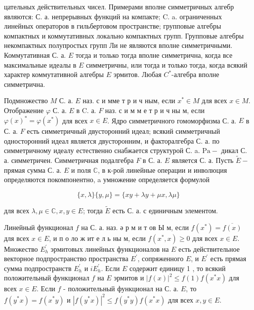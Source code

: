 \documentclass[10pt]{article}
\begin{document}
цательных действительных чисел. Примерами вполне симметричных алгебр являются: С. а. непрерывных функций на компакте; C. a. ограниченных линейных операторов в гильбертовом пространстве; групповые алгебры компактных и коммутативных локально компактных групп. Групповые алгебры некомпактных полупростых групп Ли не являются вполне симметричными. Коммутативная С. а. $E$ тогда и только тогда вполне симметрична, когда все максимальные идеалы в $E$ симметричны, или тогда и только тогда, когда всякий характер коммутативной алгебры $E$ эрмитов. Любая $C^{*}$-алгебра вполне симметрична.



Подмножество $M$ С. а. $E$ наз. с и мме т р и ч ным, если $x^{*} \in M$ для всех $x \in M$. Отображение $\varphi$ С. а. $E$ в C. а. $F$ наз. с и м м е т р и ч ны м, если $\varphi(x)^{*}=\varphi\left(x^{*}\right)$ для всех $x \in E$. Ядро симметричного гомоморфизма С. а. $E$ в С. а. $F$ есть симметричный двусторонний идеал; всякий симметричный односторонний идеал является двусторонним, и факторалгебра С. а. по симметричному идеалу естественно снабжается структурой С. a. $\mathrm{Pa}-$ дикал С. а. симметричен. Симметричная подалгебра $F$ в С. а. $E$ является С. а. Пусть $\tilde{E}-$ прямая сумма С. а. $E$ и поля $\mathbb{C}$, в к-рой линейные операции и инволюция определяются покомпонентно, a умножение определяется формулой



\[

\{x, \lambda\}\{y, \mu\}=\{x y+\lambda y+\mu x, \lambda \mu\}

\]



для всех $\lambda, \mu \in \mathbb{C}, x, y \in E$; тогда $\tilde{E}$ есть С. а. с единичным элементом.



Линейный функционал $f$ на С. а. наз. ә р м и т ов Ы м, если $f\left(x^{*}\right)=\overline{f(x)}$ для всех $x \in E$, и п о ло ж ит е л ь ны м, если $f\left(x^{*}, x\right) \geqslant 0$ для всех $x \in E$. Множество $E_{h}^{\prime}$ эрмитовых линейных функционалов на $E$ есть действительное векторное подпространство пространства $E^{\prime}$, сопряженного $E$, и $E^{\prime}$ есть прямая сумма подпространств $E_{h}^{\prime}$ и $i E_{h}^{\prime}$. Если $E$ содержит единицу 1 , то всякий положительный функционал $f$ на $E$ эрмитов и $|f(x)|^{2} \leqslant f(1) f\left(x^{*} x\right)$ для всех $x \in E$. Если $f$ - положительный функционал на С. а. $E$, то $f\left(y^{*} x\right)=f\left(x^{*} y\right)$ и $\left|f\left(y^{*} x\right)\right|^{2} \leqslant f\left(y^{*} y\right) f\left(x^{*} x\right)$ для всех $x, y \in E$.
\end{document}
